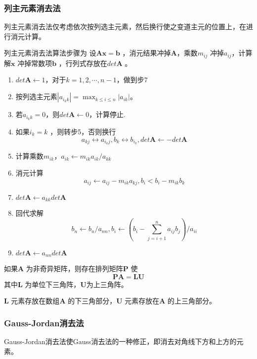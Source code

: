 \documentclass[a4paper]{article}
\begin{document}
\subsubsection{列主元素消去法}
列主元素消去法仅考虑依次按列选主元素，然后换行使之变道主元的位置上，在进行消元计算。

列主元素消去法算法步骤为
设$\mathbf{A}\mathbf{x} = \mathbf{b}$ ，消元结果冲掉$\mathbf{A}$，乘数$m_{ij}$ 冲掉$a_{ij}$，计算解$\mathbf{x}$ 冲掉常数项$\mathbf{b}$ ，行列式存放在$det\mathbf{A}$ 。
\begin{enumerate}
	\item $det \mathbf{A} \gets 1$，对于$k=1,2,\cdots,n-1$，做到步7
	\item 按列选主元素$|a_{i_kk}| = \max_{k \le i \le n} |a_{ik}|$。
	\item 若$a_{i_k k} = 0$，则$det \mathbf{A} \gets 0$，计算停止.
	\item 如果$i_k = k$ ，则转步5，否则换行
		\[
			a_{kj} \leftrightarrow a_{i_k j}, b_k \leftrightarrow b_{i_k}, det \mathbf{A} \gets -det \mathbf{A}
		\] 
	\item 计算乘数$m_{ik}$，$a_{ik} \gets m_{ik} a_{ik} / a_{kk}$
	\item 消元计算
		\[
			a_{ij} \gets a_{ij} - m_{ik} a_{kj}, b_i < b_i - m_{ik} b_k
		\] 
	\item $det \mathbf{A} \gets a_{kk} det \mathbf{A}$
	\item 回代求解
		\[
			b_n \gets b_n / a_{nn}, b_i \gets (b_i - \sum_{j=i+1}^{n} a_{ij} b_j) / a_{ii}
		\] 
	\item $det \mathbf{A} \gets a_{nn} det \mathbf{A}$
\end{enumerate}	

\begin{theorem}
	如果$\mathbf{A}$ 为非奇异矩阵，则存在排列矩阵$\mathbf{P}$ 使
	\[
		\mathbf{PA} = \mathbf{LU}
	\] 
	其中$\mathbf{L}$ 为单位下三角阵，$\mathbf{U}$为上三角阵。
\end{theorem}
$\mathbf{L}$ 元素存放在数组$\mathbf{A}$ 的下三角部分，$\mathbf{U}$ 元素存放在$\mathbf{A}$ 的上三角部分。

\subsubsection{Gauss-Jordan消去法}
Gauss-Jordan消去法使Gauss消去法的一种修正，即消去对角线下方和上方的元素。
\end{document}
